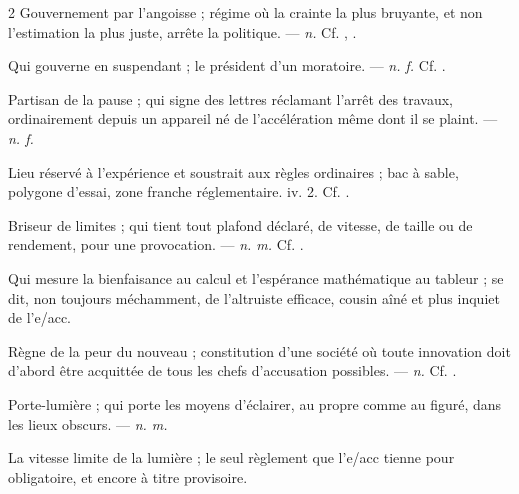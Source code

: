 \begin{multicols}{2}
 Gouvernement par l'angoisse ; régime où la crainte la plus bruyante, et non l'estimation la plus juste, arrête la politique. —  \textit{n.} Cf. , .

 Qui gouverne en suspendant ; le président d'un moratoire.   —  \textit{n. f.} Cf. .

 Partisan de la pause ; qui signe des lettres réclamant l'arrêt des travaux, ordinairement depuis un appareil né de l'accélération même dont il se plaint. —  \textit{n. f.}

 Lieu réservé à l'expérience et soustrait aux règles ordinaires ; bac à sable, polygone d'essai, zone franche réglementaire.   iv. 2. Cf. .

 Briseur de limites ; qui tient tout plafond déclaré, de vitesse, de taille ou de rendement, pour une provocation. —  \textit{n. m.} Cf. .

 Qui mesure la bienfaisance au calcul et l'espérance mathématique au tableur ; se dit, non toujours méchamment, de l'altruiste efficace, cousin aîné et plus inquiet de l'e/acc.

 Règne de la peur du nouveau ; constitution d'une société où toute innovation doit d'abord être acquittée de tous les chefs d'accusation possibles. —  \textit{n.} Cf. .

 Porte-lumière ; qui porte les moyens d'éclairer, au propre comme au figuré, dans les lieux obscurs. —  \textit{n. m.}

 La vitesse limite de la lumière ; le seul règlement que l'e/acc tienne pour obligatoire, et encore à titre provisoire.


\end{multicols}
